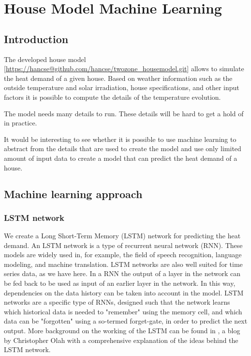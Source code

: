 \section{House Model Machine Learning}

\subsection{Introduction}\label{s:introduction}
The developed house model [\url{https://hancse@github.com/hancse/twozone\_housemodel.git}] allows to simulate the heat demand of a given house. Based on weather information such as the outside temperature and solar irradiation, house specifications, and other input factors it is possible to compute the details of the temperature evolution. 

The model needs many details to run. These details will be hard to get a hold of in practice.

It would be interesting to see whether it is possible to use machine learning to abstract from the details that are used to create the model and use only limited amount of input data to create a model that can predict the heat demand of a house. 

 




\subsection{Machine learning approach}\label{s:MLA}


\subsubsection{LSTM network}
We create a Long Short-Term Memory (LSTM) network for predicting the heat demand. An LSTM network is a type of recurrent neural network (RNN). These models are widely used in, for example, the field of speech recognition, language modeling, and machine translation. LSTM networks are also well suited for time series data, as we have here. In a RNN the output of a layer in the network can be fed back to be used as input of an earlier layer in the network. In this way, dependencies on the data history can be taken into account in the model. LSTM networks are a specific type of RNNs, designed such that the network learns which historical data is needed to 
"remember" using the memory cell, and which data can be "forgotten" using a so-termed forget-gate, in order to predict the next output. More background on the working of the LSTM can be found in \cite{LSTM}, a blog by Christopher Olah with a comprehensive explanation of the ideas behind the LSTM network. 

